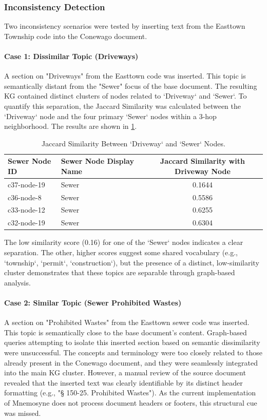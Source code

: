 \subsubsection{Inconsistency Detection}
Two inconsistency scenarios were tested by inserting text from the Easttown Township code into the Conewago document.

\paragraph{Case 1: Dissimilar Topic (Driveways)}
A section on "Driveways" from the Easttown code was inserted. This topic is semantically distant from the "Sewer" focus of the base document. The resulting KG contained distinct clusters of nodes related to `Driveway` and `Sewer`. To quantify this separation, the Jaccard Similarity was calculated between the `Driveway` node and the four primary `Sewer` nodes within a 3-hop neighborhood. The results are shown in \cref{tab:jaccard_driveway}.

\begin{table}[!htbp]
\centering
\begin{tabular}{@{}llc@{}}
\toprule
\textbf{Sewer Node ID} & \textbf{Sewer Node Display Name} & \textbf{Jaccard Similarity with Driveway Node} \\ \midrule
c37-node-19 & Sewer & 0.1644 \\
c36-node-8  & Sewer & 0.5586 \\
c33-node-12 & Sewer & 0.6255 \\
c32-node-19 & Sewer & 0.6304 \\ \bottomrule
\end{tabular}
\caption{Jaccard Similarity Between `Driveway` and `Sewer` Nodes.}
\label{tab:jaccard_driveway}
\end{table}

The low similarity score (0.16) for one of the `Sewer` nodes indicates a clear separation. The other, higher scores suggest some shared vocabulary (e.g., `township`, `permit`, `construction`), but the presence of a distinct, low-similarity cluster demonstrates that these topics are separable through graph-based analysis.

\paragraph{Case 2: Similar Topic (Sewer Prohibited Wastes)}
A section on "Prohibited Wastes" from the Easttown sewer code was inserted. This topic is semantically close to the base document's content. Graph-based queries attempting to isolate this inserted section based on semantic dissimilarity were unsuccessful. The concepts and terminology were too closely related to those already present in the Conewago document, and they were seamlessly integrated into the main KG cluster. However, a manual review of the source document revealed that the inserted text was clearly identifiable by its distinct header formatting (e.g., "§ 150-25. Prohibited Wastes"). As the current implementation of Mnemosyne does not process document headers or footers, this structural cue was missed.

